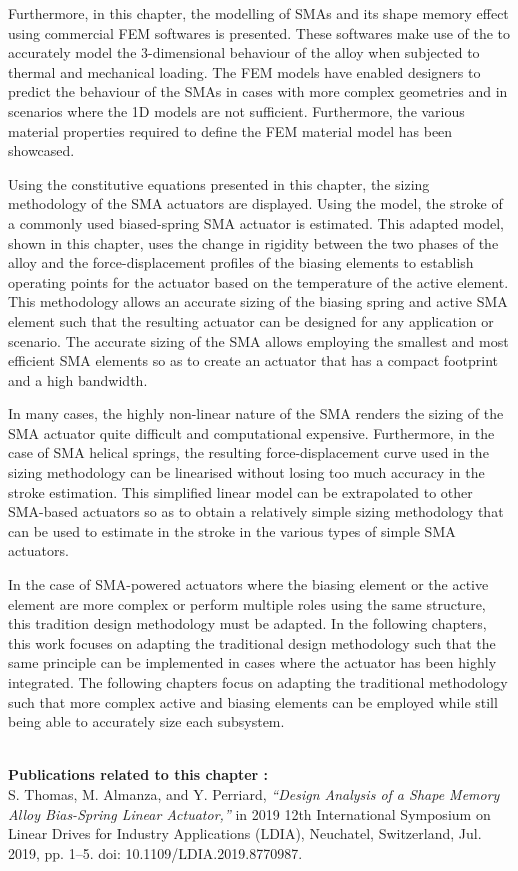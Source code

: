 Furthermore, in this chapter, the modelling of SMAs and its shape memory effect using commercial FEM softwares is presented. These softwares make use of the \cite{auricchioRobustIntegrationalgorithmFinitestrain2001} to accurately model the 3-dimensional behaviour of the alloy when subjected to thermal and mechanical loading. The FEM models have enabled designers to predict the behaviour of the SMAs in cases with more complex geometries and in scenarios where the 1D \cite{brinsonOneDimensionalConstitutiveBehavior1993} models are not sufficient. Furthermore, the various material properties required to define the FEM material model has been showcased.

Using the constitutive equations presented in this chapter, the sizing methodology of the SMA actuators are displayed. Using the \cite{brinsonOneDimensionalConstitutiveBehavior1993} model, the stroke of a commonly used biased-spring SMA actuator is estimated. This adapted model, shown in this chapter, uses the change in rigidity between the two phases of the alloy and the force-displacement profiles of the biasing elements to establish operating points for the actuator based on the temperature of the active element. This methodology allows an accurate sizing of the biasing spring and active SMA element such that the resulting actuator can be designed for any application or scenario. The accurate sizing of the SMA allows employing the smallest and most efficient SMA elements so as to create an actuator that has a compact footprint and a high bandwidth.

In many cases, the highly non-linear nature of the SMA renders the sizing of the SMA actuator quite difficult and computational expensive. Furthermore, in the case of SMA helical springs, the resulting force-displacement curve used in the sizing methodology can be linearised without losing too much accuracy in the stroke estimation. This simplified linear model can be extrapolated to other SMA-based actuators so as to obtain a relatively simple sizing methodology that can be used to estimate in the stroke in the various types of simple SMA actuators.

In the case of SMA-powered actuators where the biasing element or the active element are more complex or perform multiple roles using the same structure, this tradition design methodology must be adapted. In the following chapters, this work focuses on adapting the traditional design methodology such that the same principle can be implemented in cases where the actuator has been highly integrated. The following chapters focus on adapting the traditional methodology such that more complex active and biasing elements can be employed while still being able to accurately size each subsystem.

\vspace*{\fill}
\noindent\hrulefill \\
\textbf{\large Publications related to this chapter :}\\

S. Thomas, M. Almanza, and Y. Perriard, \textit{“Design Analysis of a Shape Memory Alloy Bias-Spring Linear Actuator,”} in 2019 12th International Symposium on Linear Drives for Industry Applications (LDIA), Neuchatel, Switzerland, Jul. 2019, pp. 1–5. doi: 10.1109/LDIA.2019.8770987.

